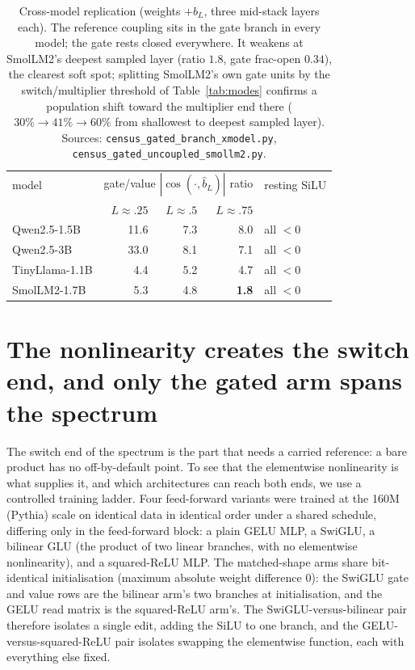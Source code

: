 \documentclass[11pt]{article}
\newcommand{\bl}{b_L}
\newcommand{\blh}{\hat{b}_L}
\begin{document}
\begin{table}[t]
\centering\small
\begin{tabular}{lrrrl}
\toprule
model & \multicolumn{3}{c}{gate/value $|\cos(\cdot,\blh)|$ ratio} & resting SiLU \\
      & $L{\approx}.25$ & $L{\approx}.5$ & $L{\approx}.75$ & \\
\midrule
Qwen2.5-1.5B   & 11.6 & 7.3 & 8.0 & all $<0$ \\
Qwen2.5-3B     & 33.0 & 8.1 & 7.1 & all $<0$ \\
TinyLlama-1.1B &  4.4 & 5.2 & 4.7 & all $<0$ \\
SmolLM2-1.7B   &  5.3 & 4.8 & \textbf{1.8} & all $<0$ \\
\bottomrule
\end{tabular}
\caption{Cross-model replication (weights $+\bl$, three mid-stack layers each).
The reference coupling sits in the gate branch in every model; the gate rests
closed everywhere. It weakens at SmolLM2's deepest sampled layer (ratio $1.8$,
gate frac-open $0.34$), the clearest soft spot; splitting SmolLM2's own gate
units by the switch/multiplier threshold of Table~\ref{tab:modes} confirms a
population shift toward the multiplier end there ($30\%\to41\%\to60\%$ from
shallowest to deepest sampled layer).
Sources: \texttt{census\_gated\_branch\_xmodel.py},
\texttt{census\_gated\_uncoupled\_smollm2.py}.}
\label{tab:xmodel}
\end{table}

\section{The nonlinearity creates the switch end, and only the gated arm spans the spectrum}
\label{sec:ladder}

The switch end of the spectrum is the part that needs a carried reference: a bare
product has no off-by-default point. To see that the elementwise nonlinearity is
what supplies it, and which architectures can reach both ends, we use a controlled
training ladder. Four feed-forward variants were trained at the 160M
(Pythia) scale on identical data in identical order under a shared schedule,
differing only in the feed-forward block: a plain GELU MLP, a SwiGLU, a bilinear
GLU (the product of two linear branches, with no elementwise nonlinearity), and a
squared-ReLU MLP. The matched-shape arms share bit-identical initialisation
(maximum absolute weight difference $0$): the SwiGLU gate and value rows are the
bilinear arm's two branches at initialisation, and the GELU read matrix is the
squared-ReLU arm's. The SwiGLU-versus-bilinear pair therefore isolates a single
edit, adding the SiLU to one branch, and the GELU-versus-squared-ReLU pair
isolates swapping the elementwise function, each with everything else fixed.
\end{document}
